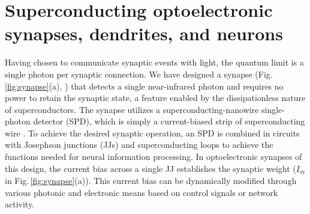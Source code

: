 \documentclass[twocolumn]{article}
\begin{document}
\section{\label{sec:synapses_dendrites_neurons}Superconducting optoelectronic synapses, dendrites, and neurons}
Having chosen to communicate synaptic events with light, the quantum limit is a single photon per synaptic connection. We have designed a synapse (Fig.\,\ref{fig:synapse}(a), \cite{sh2018,sh2019,sh2020}) that detects a single near-infrared photon and requires no power to retain the synaptic state, a feature enabled by the dissipationless nature of superconductors. The synapse utilizes a superconducting-nanowire single-photon detector (SPD), which is simply a current-biased strip of superconducting wire \cite{mave2013}. To achieve the desired synaptic operation, an SPD is combined in circuits with Josephson junctions (JJs) and superconducting loops to achieve the functions needed for neural information processing. In optoelectronic synapses of this design, the current bias across a single JJ establishes the synaptic weight ($I_{\mathrm{sy}}$ in Fig.\,\ref{fig:synapse}(a)). This current bias can be dynamically modified through various photonic and electronic means based on control signals or network activity. 
\end{document}
